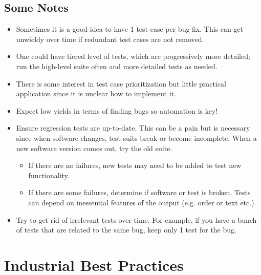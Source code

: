 \documentclass[11pt]{article}
\begin{document}
\subsection*{Some Notes}

\begin{itemize}

\item Sometimes it is a good idea to have 1 test case per bug fix. This can get unwieldy over time if redundant test cases are not removed.

\item One could have tiered level of tests, which are progressively more detailed; run the high-level suite often and more detailed tests as needed.

\item There is some interest in test case prioritization but little practical application since it is unclear how to implement it.

\item Expect low yields in terms of finding bugs so automation is key!

\item Ensure regression tests are up-to-date. This can be a pain but is necessary since when software changes, test suits break or become incomplete. When a new software version comes out, try the old suite. 

\begin{itemize}
\item If there are no failures, new tests may need to be added to test new functionality.

\item If there are some failures, determine if software or test is broken. Tests can depend on inessential features of the output (e.g. order or text etc.).
\end{itemize}

\item Try to get rid of irrelevant tests over time. For example, if you have a bunch of tests that are related to the same bug, keep only 1 test for the bug. 
\end{itemize}

\section*{Industrial Best Practices}
\end{document}
